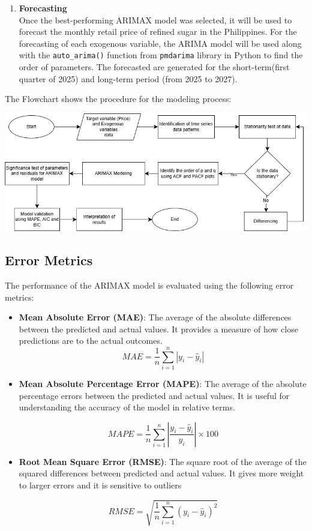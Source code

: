 \documentclass[11pt]{article}
\begin{document}
\begin{enumerate}
    \item \textbf{Forecasting}\\
    Once the best-performing ARIMAX model was selected, it will be used to forecast the monthly retail price of refined sugar in the Philippines. For the forecasting of each exogenous variable, the ARIMA model will be used along with the \texttt{auto\_arima()} function from \texttt{pmdarima} library in Python to find the order of parameters. The forecasted are generated for the short-term(first quarter of 2025) and long-term period (from 2025 to 2027).
\end{enumerate}

The Flowchart shows the procedure for the modeling process:
\vspace{12pt}

\includegraphics[width=\textwidth]{flowchart.png}

\subsection{Error Metrics}

The performance of the ARIMAX model is evaluated using the following error metrics:

\begin{itemize}
    \item \textbf{Mean Absolute Error (MAE)}: The average of the absolute differences between the predicted and actual values. It provides a measure of how close predictions are to the actual outcomes. 
    $$
        MAE = \frac{1}{n} \sum_{i=1}^{n} |y_{i} - \hat{y}_{i}|  
    $$

    \item \textbf{Mean Absolute Percentage Error (MAPE)}: The average of the absolute percentage errors between the predicted and actual values. It is useful for understanding the accuracy of the model in relative terms.

    $$
        MAPE = \frac{1}{n} \sum_{i=1}^{n} \left| \frac{y_{i} - \hat{y}_{i}}{y_{i}} \right| \times 100  
    $$

    \item \textbf{Root Mean Square Error (RMSE)}: The square root of the average of the squared differences between predicted and actual values. It gives more weight to larger errors and it is sensitive to outliers
    
    $$
        RMSE = \sqrt{\frac{1}{n} \sum_{i=1}^{n} (y_{i} - \hat{y}_{i})^{2}}  
    $$
\end{itemize}
\end{document}
